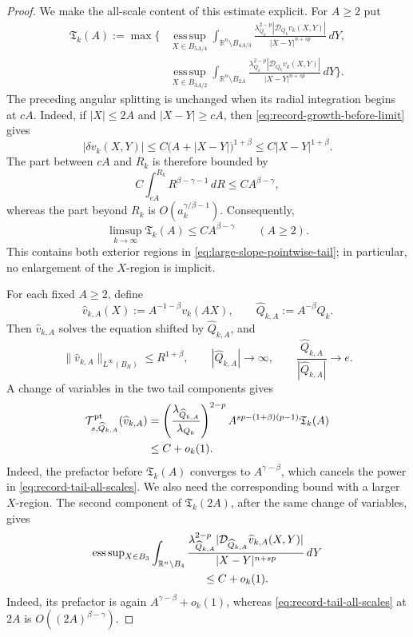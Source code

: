 \documentclass[11pt,reqno]{amsart}
\numberwithin{equation}{section}
\newcommand{\R}{\mathbb R}
\newcommand{\dd}{\,d}
\theoremstyle{remark}
\begin{document}
\begin{proof}
We make the all-scale content of this estimate explicit.  For \(A\ge2\)
put
\begin{align*}
 \mathfrak T_k(A):=\max\biggl\{&
 {\operatorname*{ess\,sup}}_{X\in B_{5A/4}}
 \int_{\R^n\setminus B_{4A/3}}
 \frac{\lambda_{Q_k}^{2-p}|\mathcal D_{Q_k}v_k(X,Y)|}
 {|X-Y|^{n+sp}}\dd Y,\\
 &{\operatorname*{ess\,sup}}_{X\in B_{3A/2}}
 \int_{\R^n\setminus B_{2A}}
 \frac{\lambda_{Q_k}^{2-p}|\mathcal D_{Q_k}v_k(X,Y)|}
 {|X-Y|^{n+sp}}\dd Y\biggr\}.
\end{align*}
The preceding angular splitting is unchanged when its radial
integration begins at \(cA\).  Indeed, if \(|X|\le2A\) and
\(|X-Y|\ge cA\), then \eqref{eq:record-growth-before-limit} gives
\[
 |\delta v_k(X,Y)|
 \le C\bigl(A+|X-Y|\bigr)^{1+\beta}
 \le C|X-Y|^{1+\beta}.
\]
The part between \(cA\) and \(R_k\) is therefore bounded by
\[
 C\int_{cA}^{R_k}R^{\beta-\gamma-1}\dd R
 \le CA^{\beta-\gamma},
\]
whereas the part beyond \(R_k\) is
\(O(a_k^{\gamma/\beta-1})\).  Consequently,
\begin{equation}
 \limsup_{k\to\infty}\mathfrak T_k(A)
 \le CA^{\beta-\gamma}
 \qquad(A\ge2).
 \label{eq:record-tail-all-scales}
\end{equation}
This contains both exterior regions in
\eqref{eq:large-slope-pointwise-tail}; in particular, no enlargement of
the \(X\)-region is implicit.

For each fixed \(A\ge2\), define
\[
 \widehat v_{k,A}(X):=A^{-1-\beta}v_k(AX),
 \qquad
 \widehat Q_{k,A}:=A^{-\beta}Q_k.
\]
Then \(\widehat v_{k,A}\) solves the equation shifted by
\(\widehat Q_{k,A}\), and
\[
 \|\widehat v_{k,A}\|_{L^\infty(B_R)}\le R^{1+\beta},
 \qquad
 |\widehat Q_{k,A}|\longrightarrow\infty,
 \qquad
 \frac{\widehat Q_{k,A}}{|\widehat Q_{k,A}|}\longrightarrow e.
\]
A change of variables in the two tail components gives
\begin{align}
 \mathcal T^{\rm pt}_{s,\widehat Q_{k,A}}
       (\widehat v_{k,A})
 &=
 \left(\frac{\lambda_{\widehat Q_{k,A}}}{\lambda_{Q_k}}\right)^{2-p}
 A^{sp-(1+\beta)(p-1)}\mathfrak T_k(A)\notag\\
 &\le C+o_k(1).
 \label{eq:scaled-record-tail}
\end{align}
Indeed, the prefactor before \(\mathfrak T_k(A)\) converges to
\(A^{\gamma-\beta}\), which cancels the power in
\eqref{eq:record-tail-all-scales}.  We also need the corresponding
bound with a larger \(X\)-region.  The second component of
\(\mathfrak T_k(2A)\), after the same change of variables, gives
\begin{equation}
 \begin{split}
 &{\operatorname*{ess\,sup}}_{X\in B_3}
 \int_{\R^n\setminus B_4}
 \frac{\lambda_{\widehat Q_{k,A}}^{2-p}
 |\mathcal D_{\widehat Q_{k,A}}\widehat v_{k,A}(X,Y)|}
 {|X-Y|^{n+sp}}\dd Y\\
 &\hspace{35mm}\le C+o_k(1).
 \end{split}
 \label{eq:scaled-record-expanded-tail}
\end{equation}
Indeed, its prefactor is again \(A^{\gamma-\beta}+o_k(1)\), whereas
\eqref{eq:record-tail-all-scales} at \(2A\) is
\(O((2A)^{\beta-\gamma})\).


\end{proof}
\end{document}
